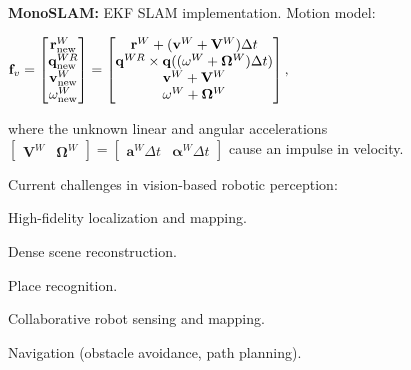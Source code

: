 \documentclass[landscape]{article}
\newcommand{\vmspace}{\vspace{-7pt}}
\newcommand{\vpspace}{\vspace{5pt}}
\begin{document}
\begin{multicols}{3}
\begin{minipage}{\columnwidth}
  \textbf{MonoSLAM:} EKF SLAM implementation. Motion model:
  \vmspace
  \begin{center}
    $
    \textbf f_v
    =
    \left[
    \begin{matrix}
      \mathbf r_\mathrm{new}^W \\
      \mathbf q_\mathrm{new}^{WR} \\
      \mathbf v_\mathrm{new}^W \\
      \mathbf \omega_\mathrm{new}^W
    \end{matrix}
    \right]
    =
    \left[
    \begin{matrix}
      \mathbf r^W
      + (\mathbf v^W + \mathbf V^W)\Delta t \\
      \mathbf q^{WR}
      \times \mathbf q((\omega^W+\mathbf\Omega^W)\Delta t)\\
      \mathbf v^W + \mathbf V^W\\
      \mathbf \omega^W + \mathbf \Omega^W
    \end{matrix}
    \right],\;\;
    $
  \end{center}
  \vmspace
  where the unknown linear and angular accelerations
  $
    \left[
    \begin{matrix}
      \mathbf V^W &
      \mathbf \Omega^W
    \end{matrix}
    \right]
    =
    \left[
    \begin{matrix}
      \mathbf a^W\Delta t &
      \mathbf \alpha^W\Delta t
    \end{matrix}
    \right]
  $
  cause an impulse in velocity.
\end{minipage}

\vpspace

\begin{minipage}{\columnwidth}
  Current challenges in vision-based robotic perception:
  \begin{compactenum}
  \item High-fidelity localization and mapping.
  \item Dense scene reconstruction.
  \item Place recognition.
  \item Collaborative robot sensing and mapping.
  \item Navigation (obstacle avoidance, path planning).
  \end{compactenum}
\end{minipage}

\vfill



\end{multicols}
\end{document}
